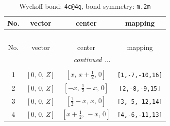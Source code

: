 \documentclass[fleqn,8pt]{jsarticle}
\begin{document}
\renewcommand{\arraystretch}{1.2}
\begin{longtable}{cccc}
\caption{Wyckoff bond: {\tt 4c@4g}, bond symmetry: {\tt m.2m}}
 \\
 \hline \hline
No. & vector & center & mapping \\ \hline \endfirsthead

\multicolumn{3}{l}{\tablename\ \thetable{}} \\
 \hline \hline
No. & vector & center & mapping \\ \hline \endhead

 \hline \hline
\multicolumn{3}{r}{\footnotesize\it continued ...} \\ \endfoot

 \hline \hline
\multicolumn{3}{r}{} \\ \endlastfoot

1 & $\left[ 0,\, 0,\, Z \right]$ & $\left[ x,\, x + \frac{1}{2},\, 0 \right]$ & {\tt [1,-7,-10,16]} \\ \hline
2 & $\left[ 0,\, 0,\, Z \right]$ & $\left[ - x,\, \frac{1}{2} - x,\, 0 \right]$ & {\tt [2,-8,-9,15]} \\ \hline
3 & $\left[ 0,\, 0,\, Z \right]$ & $\left[ \frac{1}{2} - x,\, x,\, 0 \right]$ & {\tt [3,-5,-12,14]} \\ \hline
4 & $\left[ 0,\, 0,\, Z \right]$ & $\left[ x + \frac{1}{2},\, - x,\, 0 \right]$ & {\tt [4,-6,-11,13]} \\
\end{longtable}
\renewcommand{\arraystretch}{1.2}
\end{document}
